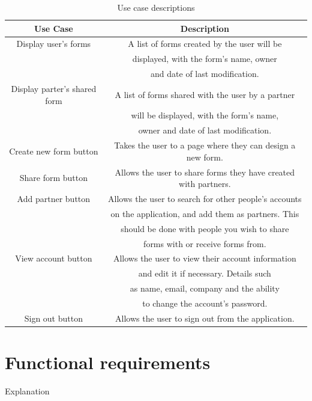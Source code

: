 \begin{table}
    \centering
    \begin{tabular}{|c|c|}
        \hline
        Use Case & Description\\
        \hline
        \hline
        Display user's forms & A list of forms created by the user will be\\ & displayed, with the form's name, owner\\ & and date of last modification.\\
        \hline
        Display parter's shared form & A list of forms shared with the user by a partner\\ & will be displayed, with the form's name,\\ & owner and date of last modification.\\
        \hline
        Create new form button & Takes the user to a page where they can design a new form.\\
        \hline
        Share form button & Allows the user to share forms they have created with partners.\\
        \hline
        Add partner button & Allows the user to search for other people's accounts\\ & on the application, and add them as partners. This\\ & should be done with people you wish to share\\ & forms with or receive forms from.\\
        \hline
        View account button & Allows the user to view their account information\\ & and edit it if necessary. Details such\\ & as name, email, company and the ability\\ & to change the account's password.\\
        \hline
        Sign out button & Allows the user to sign out from the application.\\
        \hline
    \end{tabular}
    \caption{Use case descriptions}
    \label{tab:my_label}
\end{table}

\section{Functional requirements}
Explanation

